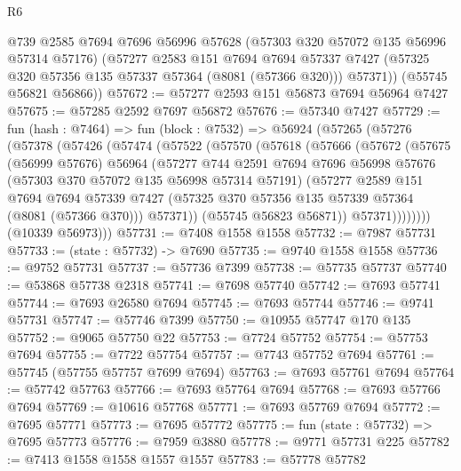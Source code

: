 \begin{lexlean}{R6}
\begin{coremodule}
        @739
        @2585
        @7694
        @7696
        @56996
        @57628
        (@57303 @320 @57072 @135 @56996 @57314 @57176)
        (@57277
          @2583
          @151
          @7694
          @7694
          @57337
          @7427
          (@57325 @320 @57356 @135 @57337 @57364 (@8081 (@57366 @320)))
          @57371))
      (@55745 @56821 @56866))
@57672 := @57277 @2593 @151 @56873 @7694 @56964 @7427
@57675 := @57285 @2592 @7697 @56872
@57676 := @57340 @7427
@57729 := fun (hash : @7464) =>
  fun (block : @7532) =>
  @56924
    (@57265
      (@57276
        (@57378
          (@57426
            (@57474
              (@57522
                (@57570
                  (@57618
                    (@57666
                      (@57672
                        (@57675
                          (@56999 @57676)
                          @56964
                          (@57277
                            @744
                            @2591
                            @7694
                            @7696
                            @56998
                            @57676
                            (@57303 @370 @57072 @135 @56998 @57314 @57191)
                            (@57277
                              @2589
                              @151
                              @7694
                              @7694
                              @57339
                              @7427
                              (@57325 @370 @57356 @135 @57339 @57364 (@8081 (@57366 @370)))
                              @57371))
                          (@55745 @56823 @56871))
                        @57371))))))))
        (@10339 @56973)))
@57731 := @7408 @1558 @1558
@57732 := @7987 @57731
@57733 := (state : @57732) -> @7690
@57735 := @9740 @1558 @1558
@57736 := @9752 @57731
@57737 := @57736 @7399
@57738 := @57735 @57737
@57740 := @53868 @57738 @2318
@57741 := @7698 @57740
@57742 := @7693 @57741
@57744 := @7693 @26580 @7694
@57745 := @7693 @57744
@57746 := @9741 @57731
@57747 := @57746 @7399
@57750 := @10955 @57747 @170 @135
@57752 := @9065 @57750 @22
@57753 := @7724 @57752
@57754 := @57753 @7694
@57755 := @7722 @57754
@57757 := @7743 @57752 @7694
@57761 := @57745 (@57755 @57757 @7699 @7694)
@57763 := @7693 @57761 @7694
@57764 := @57742 @57763
@57766 := @7693 @57764 @7694
@57768 := @7693 @57766 @7694
@57769 := @10616 @57768
@57771 := @7693 @57769 @7694
@57772 := @7695 @57771
@57773 := @7695 @57772
@57775 := fun (state : @57732) => @7695 @57773
@57776 := @7959 @3880
@57778 := @9771 @57731 @225
@57782 := @7413 @1558 @1558 @1557 @1557
@57783 := @57778 @57782

\end{coremodule}
\end{lexlean}
